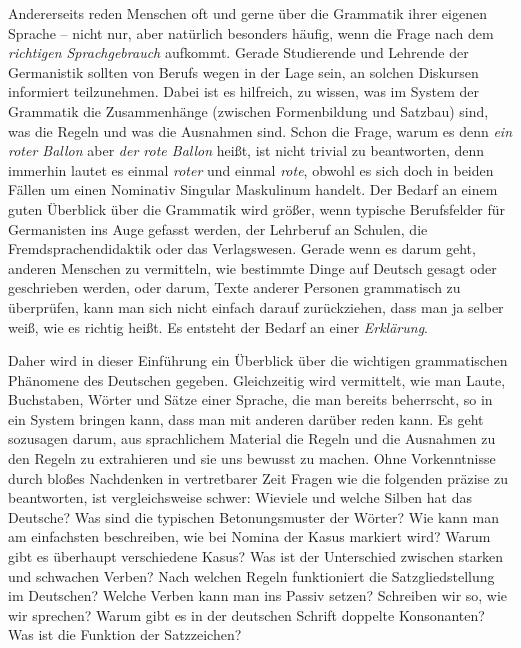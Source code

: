 Andererseits reden Menschen oft und gerne über die Grammatik ihrer eigenen Sprache -- nicht nur, aber natürlich besonders häufig, wenn die Frage nach dem \textit{richtigen Sprachgebrauch} aufkommt.
Gerade Studierende und Lehrende der Germanistik sollten von Berufs wegen in der Lage sein, an solchen Diskursen informiert teilzunehmen.
Dabei ist es hilfreich, zu wissen, was im System der Grammatik die Zusammenhänge (\zB zwischen Formenbildung und Satzbau) sind, was die Regeln und was die Ausnahmen sind.
Schon die Frage, warum es denn \textit{ein roter Ballon} aber \textit{der rote Ballon} heißt, ist nicht trivial zu beantworten, denn immerhin lautet es einmal \textit{roter} und einmal \textit{rote}, obwohl es sich doch in beiden Fällen um einen Nominativ Singular Maskulinum handelt.
Der Bedarf an einem guten Überblick über die Grammatik wird größer, wenn typische Berufsfelder für Germanisten ins Auge gefasst werden, \zB der Lehrberuf an Schulen, die Fremdsprachendidaktik oder das Verlagswesen.
Gerade wenn es darum geht, anderen Menschen zu vermitteln, wie bestimmte Dinge auf Deutsch gesagt oder geschrieben werden, oder darum, Texte anderer Personen grammatisch zu überprüfen, kann man sich nicht einfach darauf zurückziehen, dass man ja selber weiß, wie es richtig heißt.
Es entsteht der Bedarf an einer \textit{Erklärung}.

Daher wird in dieser Einführung ein Überblick über die wichtigen grammatischen Phänomene des Deutschen gegeben.
Gleichzeitig wird vermittelt, wie man Laute, Buchstaben, Wörter und Sätze einer Sprache, die man bereits beherrscht, so in ein System bringen kann, dass man mit anderen darüber reden kann.
Es geht sozusagen darum, aus sprachlichem Material die Regeln und die Ausnahmen zu den Regeln zu extrahieren und sie uns bewusst zu machen.
Ohne Vorkenntnisse durch bloßes Nachdenken in vertretbarer Zeit Fragen wie die folgenden präzise zu beantworten, ist vergleichsweise schwer:
Wieviele und welche Silben hat das Deutsche?
Was sind die typischen Betonungsmuster der Wörter?
Wie kann man am einfachsten beschreiben, wie bei Nomina der Kasus markiert wird?
Warum gibt es überhaupt verschiedene Kasus?
Was ist der Unterschied zwischen starken und schwachen Verben?
Nach welchen Regeln funktioniert die Satzgliedstellung im Deutschen?
Welche Verben kann man ins Passiv setzen?
Schreiben wir so, wie wir sprechen?
Warum gibt es in der deutschen Schrift doppelte Konsonanten?
Was ist die Funktion der Satzzeichen?

